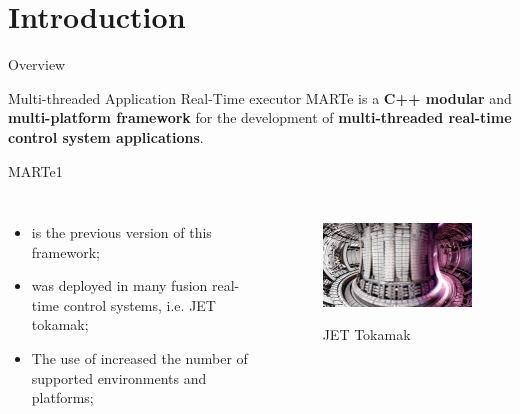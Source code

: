 
\section{Introduction}
\graphicspath{{figs/section1/}}

\begin{frame}{Overview}
	\begin{block}{Multi-threaded Application Real-Time executor}
		MARTe is a \textbf{C++ modular} and \textbf{multi-platform framework} for the development of \textbf{multi-threaded real-time control system applications}.
	\end{block}
\end{frame}

\begin{frame}{MARTe1}
	\begin{columns}
		\begin{itemize}
			\item {} is the previous version of this framework;
			\item {} was deployed in many fusion real-time control systems, i.e. JET tokamak;
			\item The use of  increased the number of supported environments and platforms;
		\end{itemize}
		\begin{figure}
			\centering
			\includegraphics[scale=.5]{JET.jpeg}
			\label{fig:jet}
			\caption{JET Tokamak}
		\end{figure}
	\end{columns}
\end{frame}
